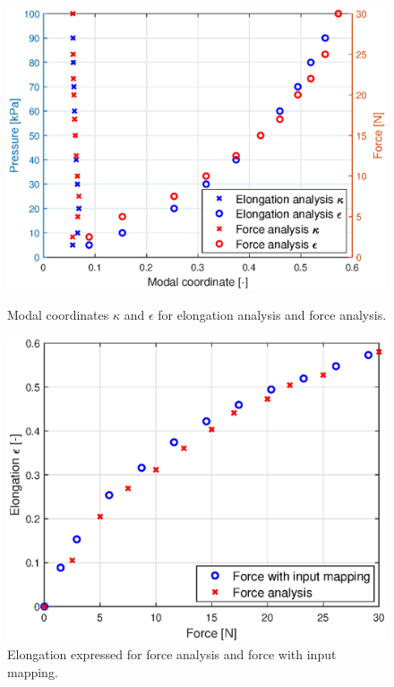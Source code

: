 \begin{figure}[H]
    \centering
\begin{minipage}{0.5\textwidth}
        \centering
        \includegraphics[width=\textwidth]{Figures/Chapter3/forcepressuremodal.eps}
        \caption{Modal coordinates $\kappa$ and $\epsilon$ for elongation analysis and force analysis.}
        \label{fig3:forcemap}
    \end{minipage}\hfill
    \begin{minipage}{0.5\textwidth}
        \centering
        \includegraphics[width=\textwidth]{Figures/Chapter3/pressureforceelongation.eps} 
        \caption{Elongation expressed for force analysis and force with input mapping.}
        \label{fig3:forcetopressure}
    \end{minipage}
\end{figure}
\newpage

